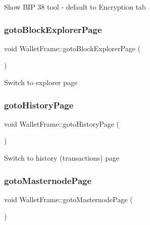 Show B\+IP 38 tool -\/ default to Encryption tab \mbox{\label{class_wallet_frame_ad6dd35096ee0df1990ed897ac6e51943}} 
\subsubsection{\texorpdfstring{gotoBlockExplorerPage}{gotoBlockExplorerPage}}
{\footnotesize\ttfamily void Wallet\+Frame\+::goto\+Block\+Explorer\+Page (\begin{DoxyParamCaption}{ }\end{DoxyParamCaption})\hspace{0.3cm}{\ttfamily [slot]}}

Switch to explorer page \mbox{\label{class_wallet_frame_a31071d5befc21c99718a8b31e1e403ee}} 
\subsubsection{\texorpdfstring{gotoHistoryPage}{gotoHistoryPage}}
{\footnotesize\ttfamily void Wallet\+Frame\+::goto\+History\+Page (\begin{DoxyParamCaption}{ }\end{DoxyParamCaption})\hspace{0.3cm}{\ttfamily [slot]}}

Switch to history (transactions) page \mbox{\label{class_wallet_frame_a6a58c9776d210a7a094742f6d580d1e1}} 
\subsubsection{\texorpdfstring{gotoMasternodePage}{gotoMasternodePage}}
{\footnotesize\ttfamily void Wallet\+Frame\+::goto\+Masternode\+Page (\begin{DoxyParamCaption}{ }\end{DoxyParamCaption})\hspace{0.3cm}{\ttfamily [slot]}}

